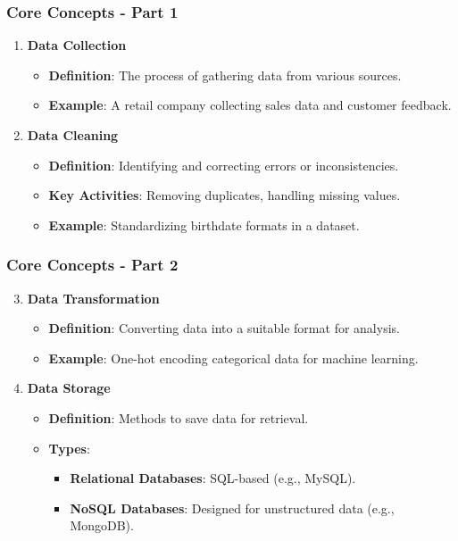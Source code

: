 \documentclass[aspectratio=169]{beamer}
\begin{document}
\begin{frame}[fragile]
    \frametitle{Core Concepts - Part 1}
    \begin{enumerate}
        \item \textbf{Data Collection} 
        \begin{itemize}
            \item \textbf{Definition}: The process of gathering data from various sources.
            \item \textbf{Example}: A retail company collecting sales data and customer feedback.
        \end{itemize}

        \item \textbf{Data Cleaning} 
        \begin{itemize}
            \item \textbf{Definition}: Identifying and correcting errors or inconsistencies.
            \item \textbf{Key Activities}: Removing duplicates, handling missing values.
            \item \textbf{Example}: Standardizing birthdate formats in a dataset.
        \end{itemize}
    \end{enumerate}
\end{frame}

\begin{frame}[fragile]
    \frametitle{Core Concepts - Part 2}
    \begin{enumerate}
        \setcounter{enumi}{2} %
        
        \item \textbf{Data Transformation} 
        \begin{itemize}
            \item \textbf{Definition}: Converting data into a suitable format for analysis.
            \item \textbf{Example}: One-hot encoding categorical data for machine learning.
        \end{itemize}

        \item \textbf{Data Storage} 
        \begin{itemize}
            \item \textbf{Definition}: Methods to save data for retrieval.
            \item \textbf{Types}:
            \begin{itemize}
                \item \textbf{Relational Databases}: SQL-based (e.g., MySQL).
                \item \textbf{NoSQL Databases}: Designed for unstructured data (e.g., MongoDB).
            \end{itemize}
        \end{itemize}
    \end{enumerate}
\end{frame}
\end{document}
